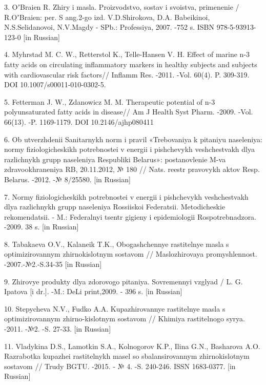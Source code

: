 3. OʼBraien R. Zhiry i masla. Proizvodstvo, sostav i svoistva,
primenenie / R.OʼBraien: per. S ang.2-go izd. V.D.Shirokova, D.A.
Babeikinoi, N.S.Selidanovoi, N.V.Magdy - SPb.: Professiya, 2007. -752 s.
ISBN 978-5-93913-123-0 {[}in Russian{]}

4. Myhrstad M. C. W., Retterstol K., Telle-Hansen V. H. Effect of marine
n-3 fatty acids on circulating inflammatory markers in healthy subjects
and subjects with cardiovascular risk factors// Inflamm Res. -2011.
-Vol. 60(4). P. 309-319. DOI 10.1007/s00011-010-0302-5.

5. Fetterman J. W., Zdanowicz M. M. Therapeutic potential of n-3
polyunsaturated fatty acids in disease// Am J Health Syst Pharm. -2009.
-Vol. 66(13). -P. 1169-1179. DOI 10.2146/ajhp080411

6. Ob utverzhdenii Sanitarnykh norm i pravil «Trebovaniya k pitaniyu
naseleniya: normy fiziologicheskikh potrebnostei v energii i pishchevykh
veshchestvakh dlya razlichnykh grupp naseleniya Respubliki
Belarus\textquotesingle»: postanovlenie M-va zdravookhraneniya RB,
20.11.2012, № 180 // Nats. reestr pravovykh aktov Resp.
Belarus\textquotesingle. -2012. -№ 8/25580. {[}in Russian{]}

7. Normy fiziologicheskikh potrebnostei v energii i pishchevykh
veshchestvakh dlya razlichnykh grupp naseleniya Rossiiskoi Federatsii.
Metodicheskie rekomendatsii. - M.: Federal\textquotesingle nyi tsentr
gigieny i epidemiologii Rospotrebnadzora. -2009. 38 s. {[}in Russian{]}

8. Tabakaeva O.V., Kalaneik T.K., Obogashchennye
rastitel\textquotesingle nye masla s optimizirovannym zhirnokislotnym
sostavom // Maslozhirovaya promyshlennost\textquotesingle.
-2007.-№2.-S.34-35 {[}in Russian{]}

9. Zhirovye produkty dlya zdorovogo pitaniya. Sovremennyi vzglyad / L.
G. Ipatova {[}i dr.{]}. -M.: DeLi print,2009. - 396 s. {[}in Russian{]}

10. Stepycheva N.V., Fud\textquotesingle ko A.A. Kupazhirovannye
rastitel\textquotesingle nye masla s optimizirovannym zhirno-kislotnym
sostavom // Khimiya rastitel\textquotesingle nogo
syr\textquotesingle ya. -2011. -№2. -S. 27-33. {[}in Russian{]}

11. Vladykina D.S., Lamotkin S.A., Kolnogorov K.P.,
Il\textquotesingle ina G.N., Basharova A.O. Razrabotka kupazhei
rastitel\textquotesingle nykh masel so sbalansirovannym zhirnokislotnym
sostavom // Trudy BGTU. -2015. - № 4. -S. 240-246. ISSN 1683-0377. {[}in
Russian{]}

